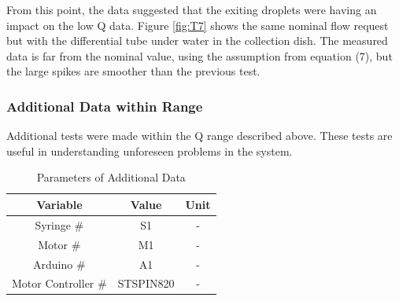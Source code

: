 \documentclass[journal]{IEEEtran}
\begin{document}
            From this point, the data suggested that the exiting droplets were having an impact on the low Q data. Figure \ref{fig:T7} shows the same nominal flow request but with the differential tube under water in the collection dish. The measured data is far from the nominal value, using the assumption from equation (7), but the large spikes are smoother than the previous test. 
                
        \subsubsection{Additional Data within Range}
            Additional tests were made within the Q range described above. These tests are useful in understanding unforeseen problems in the system.
            
            \begin{table}[H]
                    \renewcommand{\arraystretch}{1.3}
                    \caption{Parameters of Additional Data}
                    \label{table:test_param_add}
                        \begin{center}
                            \begin{tabular}{|c|c|c|}
                                \hline
                                \bfseries Variable&
                                \bfseries Value&
                                \bfseries Unit
                                \\ \hline
                                
                                Syringe \#&
                                S1&
                                -
                                \\ \hline
                                
                                Motor \#&
                                M1&
                                -
                                \\ \hline
                                
                                Arduino \#&
                                A1&
                                -
                                \\ \hline
                                
                                Motor Controller \#&
                                STSPIN820&
                                -
                                \\ \hline
                                

\end{tabular}
\end{center}
\end{table}
\end{document}
